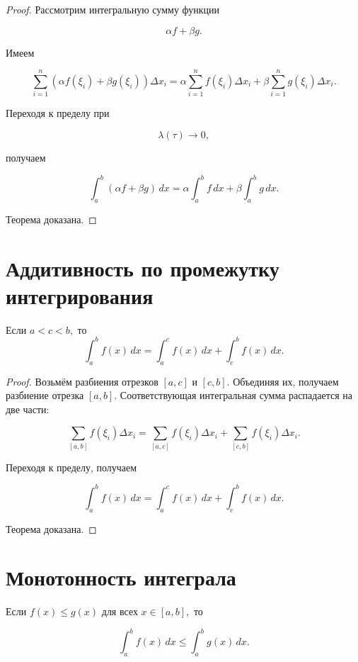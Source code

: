 \documentclass[14pt]{extreport}
\begin{document}
\begin{proof}

Рассмотрим интегральную сумму функции

\[
\alpha f+\beta g.
\]

Имеем

\[
\sum_{i=1}^{n}
(\alpha f(\xi_i)+\beta g(\xi_i))
\Delta x_i
=
\alpha
\sum_{i=1}^{n}
f(\xi_i)\Delta x_i
+
\beta
\sum_{i=1}^{n}
g(\xi_i)\Delta x_i.
\]

Переходя к пределу при

\[
\lambda(\tau)\to0,
\]

получаем

\[
\int_a^b (\alpha f+\beta g)\,dx
=
\alpha\int_a^b f\,dx
+
\beta\int_a^b g\,dx.
\]

Теорема доказана.
\end{proof}

\section{Аддитивность по промежутку интегрирования}

\begin{theorem}

Если
$
a<c<b,
$
то
\[
\boxed{
\int_a^b f(x)\,dx
=
\int_a^c f(x)\,dx
+
\int_c^b f(x)\,dx.
}
\]

\end{theorem}

\begin{proof}

Возьмём разбиения отрезков
$
[a,c]
$
и
$
[c,b].
$
Объединяя их, получаем разбиение отрезка
$
[a,b].
$
Соответствующая интегральная сумма распадается на две части:

\[
\sum_{[a,b]}
f(\xi_i)\Delta x_i
=
\sum_{[a,c]}
f(\xi_i)\Delta x_i
+
\sum_{[c,b]}
f(\xi_i)\Delta x_i.
\]

Переходя к пределу, получаем

\[
\int_a^b f(x)\,dx
=
\int_a^c f(x)\,dx
+
\int_c^b f(x)\,dx.
\]

Теорема доказана.
\end{proof}

\section{Монотонность интеграла}

\begin{theorem}

Если
$
f(x)\le g(x)
$
для всех
$
x\in[a,b],
$
то

\[
\boxed{
\int_a^b f(x)\,dx
\le
\int_a^b g(x)\,dx.
}
\]

\end{theorem}
\end{document}
